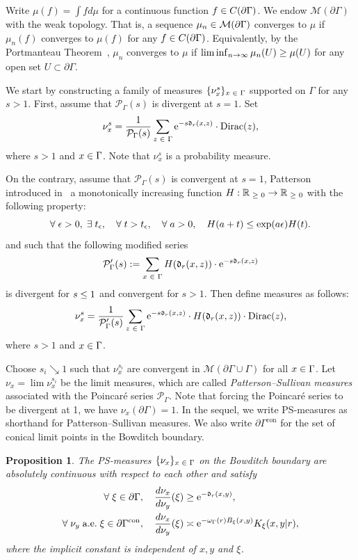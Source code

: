 \documentclass[10pt,a4paper]{amsart}
\newcommand{\pG}{\partial{\Gamma}}
\newcommand{\dirac}[1]{{\mathrm{Dirac}}{(#1)}}
\newcommand{\R}{\mathbb{R}}
\newcommand{\rme}{\mathrm{e}}
\newcommand{\fkd}{\mathfrak{d}}
\newcommand{\clM}{\mathcal{M}}
\newcommand{\clP}{\mathcal{P}}
\DeclareMathOperator{\con}{con}
\let\oldin\in
\renewcommand{\in}{\mathchoice{\oldin}{\oldin}{\,\oldin\,}{\,\oldin\,}}
\let\oldge\ge
\renewcommand{\ge}{\mathchoice{\oldge}{\oldge}{\,\oldge\,}{\,\oldge\,}}
\let\oldle\le
\renewcommand{\le}{\mathchoice{\oldle}{\oldle}{\,\oldle\,}{\,\oldle\,}}
\renewcommand*{\to}{\mathchoice{\longrightarrow}{\rightarrow}{\rightarrow}{\rightarrow}}
\let\oldexists\exists
\renewcommand*{\exists}{\mathrel{\oldexists}}
\let\oldforall\forall
\renewcommand*{\forall}{\mathrel{\oldforall}}
\newtheorem{prop}[theo]{Proposition}
\theoremstyle{definition}\newtheorem{defi}[theo]{Definition}
\begin{document}
Write $\mu(f) = \int f d\mu$ for a continuous function $f \in C(\pG)$. We endow $\clM(\pG)$ with the weak topology. That is, a sequence $\mu_n \in \clM(\pG)$ converges to $\mu$ if $\mu_n(f) $ converges to $ \mu(f)$ for any $f \in C(\pG)$. Equivalently, by the Portmanteau Theorem~\cite[Theorem~2.1]{Bill99}, $\mu_n$ converges to $\mu$ if $\liminf_{n \to \infty}\mu_n(U) \ge \mu(U)$ for any open set $U \subset \pG$.

We start by constructing a family of measures $\{\nu_x^s\}_{x\in \Gamma}$ supported on $\Gamma$ for any $s >1$. First, assume that $\clP_\Gamma(s)$ is divergent at $s=1$. Set
\[
\nu^s_x = \frac{1}{\clP_{\Gamma}(s)} \sum\limits_{z \in \Gamma} \rme^{-s\fkd_r(x,z)} \cdot \dirac{z},
\]
where $s >1$ and $x \in \Gamma$. Note that $\nu^s_x$ is a probability measure.


On the contrary, assume that $\clP_{\Gamma}(s)$ is convergent at $s=1$, Patterson introduced in~\cite[Lemma~3.1]{Patt} a monotonically increasing function $H: \R_{\ge 0} \to \R_{\ge 0}$ with the following property:
\begin{equation}\label{patterson}
\forall \epsilon >0, \;\exists t_\epsilon,\quad \forall t > t_\epsilon,\quad \forall a>0,\quad  H(a+t) \le \exp(a\epsilon) H(t).
\end{equation}
and such that the following modified series
\[
\clP_{\Gamma}'(s):=\sum\limits_{x \in \Gamma} H(\fkd_r(x,z)) \cdot \rme^{-s\fkd_r(x,z)}
\]
is divergent for $s \le 1$ and convergent for $s>1$.
Then define measures as follows:
\[
\nu^s_x = \frac{1}{\clP_{\Gamma}'(s)} \sum\limits_{z \in \Gamma} \rme^{-s \fkd_r(x,z)} \cdot H(\fkd_r(x,z)) \cdot \dirac{z},
\]
where $s >1$ and $x \in \Gamma$.

Choose $s_i \searrow 1$ such that $\nu_x^{s_i}$ are convergent in $\clM(\pG\cup\Gamma)$ for all $x\in \Gamma$. Let $\nu_x = \lim \nu_x^{s_i}$ be the limit measures, which are called \emph{Patterson--Sullivan measures} associated with the Poincaré series $\clP_\Gamma$. Note that forcing the Poincaré series to be divergent at 1, we have $\nu_x(\pG) = 1$. In the sequel, we write PS-measures as shorthand for Patterson--Sullivan measures. We also write $\partial\Gamma^{\con}$ for the set of conical limit points in the Bowditch boundary.

\begin{prop}\label{prequasiconf}
The PS-measures $\{\nu_x\}_{x\in \Gamma}$ on the Bowditch boundary are absolutely continuous with respect to each other and satisfy
\begin{align}
\forall \xi\in \pG ,\quad  \frac{d\nu_x}{d\nu_y}(\xi) &\ge \rme^{-\fkd_r(x,y)},\label{LowerBoundEQ}\\
\forall \nu_y\; \text{a.e.}\; \xi\in \pG^{\con},\quad  \frac{d\nu_{x}}{d\nu_{y}}(\xi) &\asymp \rme^{-\omega_\Gamma(r) B_\xi (x, y)}K_{\xi}(x,y|r),\label{cdensity}
\end{align}
where the implicit constant is independent of $x,y$ and $\xi$.
\end{prop}
\end{document}
